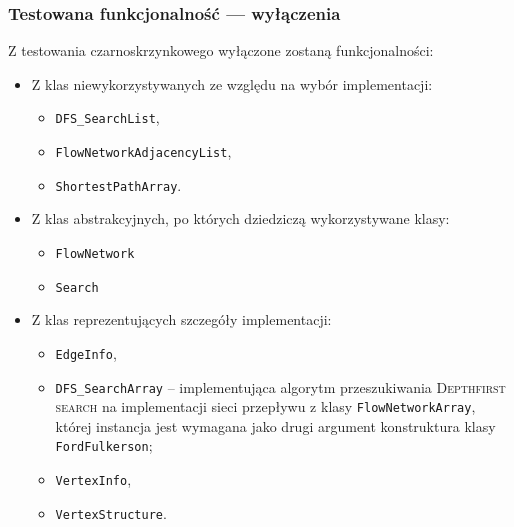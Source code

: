 \subsubsection{Testowana funkcjonalność --- wyłączenia}
Z testowania czarno\dywiz skrzynkowego wyłączone zostaną funkcjonalności:
\begin{itemize}
    \item Z klas niewykorzystywanych ze względu na wybór implementacji:
        \begin{itemize}
            \item \texttt{DFS\_SearchList},
            \item \texttt{FlowNetworkAdjacencyList},
            \item \texttt{ShortestPathArray}.
        \end{itemize}
    \item Z klas abstrakcyjnych, po których dziedziczą wykorzystywane klasy:
        \begin{itemize}
            \item \texttt{FlowNetwork}
            \item \texttt{Search}
        \end{itemize}
    \item Z klas reprezentujących szczegóły implementacji:
        \begin{itemize}
            \item \texttt{EdgeInfo},
            \item \texttt{DFS\_SearchArray} -- implementująca algorytm
                przeszukiwania \textsc{Depth\dywiz first search} na
                implementacji sieci przepływu z klasy \texttt{FlowNetworkArray},
                której instancja jest wymagana jako drugi argument konstruktura
                klasy \texttt{FordFulkerson};
            \item \texttt{VertexInfo},
            \item \texttt{VertexStructure}.
        \end{itemize}
\end{itemize}

